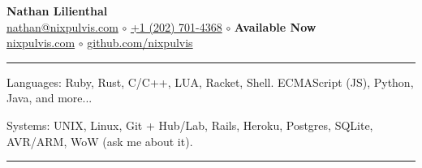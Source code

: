 \documentclass[10pt,letterpaper]{article}
\newenvironment{indentsection}[1]
{\begin{list}{}
  {\setlength{\leftmargin}{#1}} \item[]
}
{\end{list}}
\begin{document}
\begin{center}
  \huge \textbf{Nathan Lilienthal} \\
  \large
  \href{mailto:nathan@nixpulvis.com}{nathan@nixpulvis.com}
  $\circ$
  \href{tel:12027014368}{+1 (202) 701-4368}
  $\circ$
  {\bf Available Now}
  \\
  \url{nixpulvis.com}
  $\circ$
  \url{github.com/nixpulvis}
  \vspace{-0.2em}
\end{center}


\hrule
\begin{indentsection}{\parindent}
\begin{description*}
  \item[Languages:] Ruby, Rust, C/C++, LUA, Racket, Shell. ECMAScript (JS),
  Python, Java, and more...
  \item[Systems:] UNIX, Linux, Git + Hub/Lab, Rails, Heroku, Postgres, SQLite, AVR/ARM,
  WoW (ask me about it).
\end{description*}
\end{indentsection}


\hrule
\vspace{-0.4em}
\end{document}
